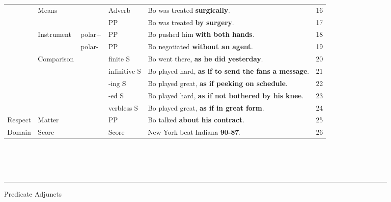 \begin{figure*} [p]
\begin{tabular}{|l|l|l|l|l|r|}
& Means & & Adverb & Bo was treated {\bf surgically}. & 16 \\\cline{4-6}
& & & PP & Bo was treated {\bf by surgery}. & 17 \\\cline{2-6}
& Instrument & polar+ & PP & Bo pushed him {\bf with both hands}. &
18 \\\cline{3-6}  
& & polar- & PP & Bo negotiated {\bf without an agent}. & 19 \\\cline{2-6} 
& Comparison & & finite S & Bo went there, {\bf as he did
yesterday}. & 20 \\\cline{4-6}  
& & & infinitive S & Bo played hard, {\bf as if to send the fans a
message}. & 21 \\\cline{4-6} 
& & & -ing S & Bo played great, {\bf as if peeking on schedule}. &
22 \\\cline{4-6}  
& & & -ed S & Bo played hard, {\bf as if not bothered by his knee}. &
23 \\\cline{4-6}   
& & & verbless S & Bo played great, {\bf as if in great form}. & 24 \\\cline{1-6}
Respect & Matter & & PP & Bo talked {\bf about his contract}. & 25 \\\cline{1-6}
Domain & Score & & Score & New York beat Indiana {\bf 90-87}. & 26 \\\cline{1-6}
\end{tabular}\\\\\\
\caption{Predicate Adjuncts}
\label{pred-adjuncts}
\rule{\textwidth}{.01in}
\end{figure*}

